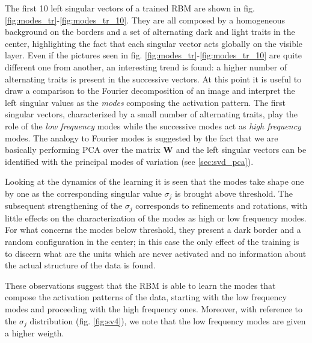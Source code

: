 \documentclass{revtex4-1}
\begin{document}
The first 10 left singular vectors of a trained RBM are shown in fig. \ref{fig:modes_tr}-\ref{fig:modes_tr_10}. They are all composed by a homogeneous background on the borders and a set of alternating dark and light traits in the center, highlighting the fact that each singular vector acts globally on the visible layer. Even if the pictures seen in fig. \ref{fig:modes_tr}-\ref{fig:modes_tr_10} are quite different one from another, an interesting trend is found: a higher number of alternating traits is present in the successive vectors. At this point it is useful to draw a comparison to the Fourier decomposition of an image and interpret the left singular values as the \textit{modes} composing the activation pattern. The first singular vectors, characterized by a small number of alternating traits, play the role of the \textit{low frequency} modes while the successive modes act as \textit{high frequency} modes. The analogy to Fourier modes is suggested by the fact that we are basically performing PCA over the matrix \textbf{W} and the left singular vectors can be identified with the principal modes of variation (see \ref{sec:svd_pca}).

Looking at the dynamics of the learning it is seen that the modes take shape one by one as the corresponding singular value \(\sigma_j\) is brought above threshold. The subsequent strengthening of the \(\sigma_j\) corresponds to refinements and rotations, with little effects on the characterization of the modes as high or low frequency modes. For what concerns the modes below threshold, they present a dark border and a random configuration in the center; in this case the only effect of the training is to discern what are the units which are never activated and no information about the actual structure of the data is found.

These observations suggest that the RBM is able to learn the modes that compose the activation patterns of the data, starting with the low frequency modes and proceeding with the high frequency ones. Moreover, with reference to the \(\sigma_j\) distribution (fig. \ref{fig:sv4}), we note that the low frequency modes are given a higher weigth.
\end{document}
